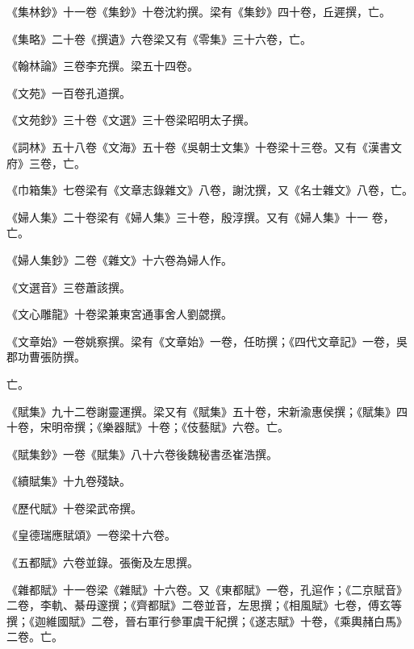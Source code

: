 \begin{pinyinscope}
 《集林鈔》十一卷《集鈔》十卷沈約撰。梁有《集鈔》四十卷，丘遲撰，亡。



 《集略》二十卷《撰遺》六卷梁又有《零集》三十六卷，亡。



 《翰林論》三卷李充撰。梁五十四卷。



 《文苑》一百卷孔道撰。



 《文苑鈔》三十卷《文選》三十卷梁昭明太子撰。



 《詞林》五十八卷《文海》五十卷《吳朝士文集》十卷梁十三卷。又有《漢書文府》三卷，亡。



 《巾箱集》七卷梁有《文章志錄雜文》八卷，謝沈撰，又《名士雜文》八卷，亡。



 《婦人集》二十卷梁有《婦人集》三十卷，殷淳撰。又有《婦人集》十一
 卷，亡。



 《婦人集鈔》二卷《雜文》十六卷為婦人作。



 《文選音》三卷蕭該撰。



 《文心雕龍》十卷梁兼東宮通事舍人劉勰撰。



 《文章始》一卷姚察撰。梁有《文章始》一卷，任昉撰；《四代文章記》一卷，吳郡功曹張防撰。



 亡。



 《賦集》九十二卷謝靈運撰。梁又有《賦集》五十卷，宋新渝惠侯撰；《賦集》四十卷，宋明帝撰；《樂器賦》十卷；《伎藝賦》六卷。亡。



 《賦集鈔》一卷《賦集》八十六卷後魏秘書丞崔浩撰。



 《續賦集》十九卷殘缺。



 《歷代賦》十卷梁武帝撰。



 《皇德瑞應賦頌》一卷梁十六卷。



 《五都賦》六卷並錄。張衡及左思撰。



 《雜都賦》十一卷梁《雜賦》十六卷。又《東都賦》一卷，孔逭作；《二京賦音》二卷，李軌、綦毋邃撰；《齊都賦》二卷並音，左思撰；《相風賦》七卷，傅玄等撰；《迦維國賦》二卷，晉右軍行參軍虞干紀撰；《遂志賦》十卷，《乘輿赭白馬》二卷。亡。




\end{pinyinscope}
